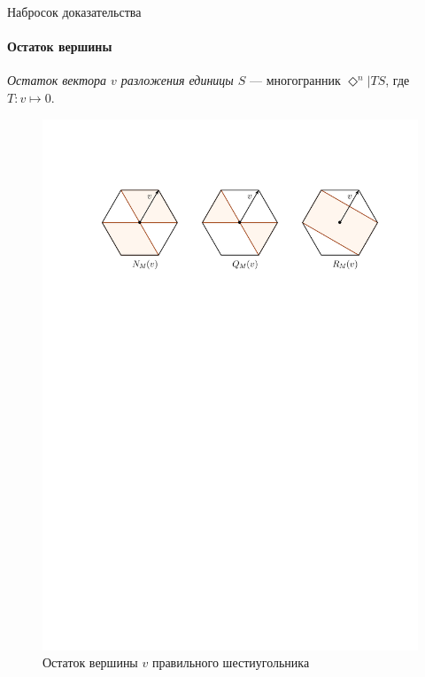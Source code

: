 \documentclass{beamer}
\newcommand{\crosp}{\Diamond}
\begin{document}
\begin{frame}{Набросок доказательства}
	\framesubtitle{Остаток вершины}
	\textit{Остаток вектора $v$ разложения единицы $S$} --- многогранник $\crosp^n|TS$, где $T\colon v\mapsto 0$.\pause
	\begin{figure}[h!]
		\begin{center}
			\includegraphics[scale=0.7]{pics/rest.pdf}
			\caption{Остаток вершины $v$ правильного шестиугольника}
		\end{center}
	\end{figure}
\end{frame}
\end{document}
